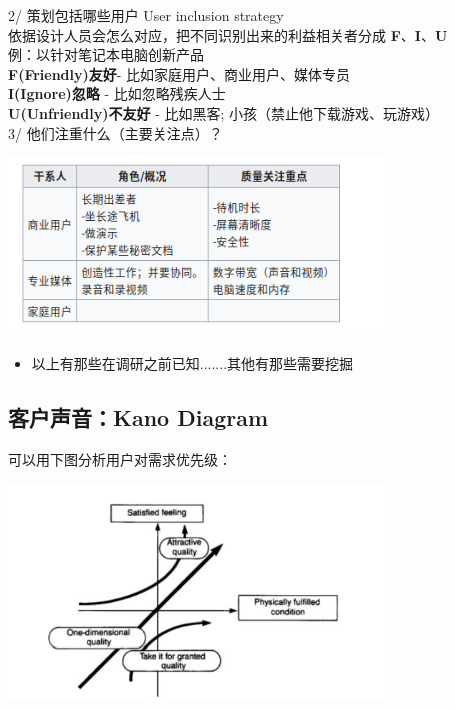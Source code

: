 2/ 策划包括哪些用户 User inclusion strategy \\
依据设计人员会怎么对应，把不同识别出来的利益相关者分成
\textbf{F}、\textbf{I}、\textbf{U}\\
例：以针对笔记本电脑创新产品\\
\textbf{F(Friendly)友好}- 比如家庭用户、商业用户、媒体专员\\
\textbf{I(Ignore)忽略} - 比如忽略残疾人士\\
\textbf{U(Unfriendly)不友好} - 比如黑客;
小孩（禁止他下载游戏、玩游戏）\\
3/ 他们注重什么（主要关注点）？


\includegraphics[width=10cm]{Screenshotfrom2023-03-2701-17-51.png}

\begin{itemize}
\tightlist
\item
  以上有那些在调研之前已知.......其他有那些需要挖掘
\end{itemize}

\hypertarget{ux5ba2ux6237ux58f0ux97f3kano-diagram}{%
\subsection{客户声音：Kano
Diagram}\label{ux5ba2ux6237ux58f0ux97f3kano-diagram}}

可以用下图分析用户对需求优先级：


\includegraphics[width=10cm]{IcKanoDiagramScreenshot_2022-12-17_120845.jpg}

